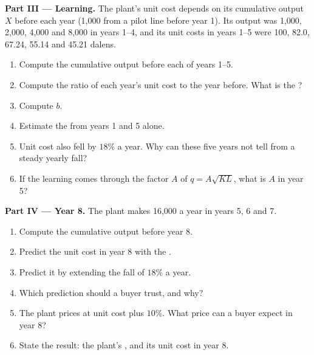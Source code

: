 \begin{problem}
\medskip\noindent\textbf{Part III --- Learning.} The plant's unit cost depends on
its cumulative output $X$ before each year (1,000 from a pilot line before
year 1). Its output was 1,000, 2,000, 4,000 and 8,000 in years 1--4, and its
unit costs in years 1--5 were 100, 82.0, 67.24, 55.14 and 45.21 dalens.
\begin{enumerate}[resume]
  \item Compute the cumulative output before each of years 1--5.
  \item Compute the ratio of each year's unit cost to the year before. What is the ?
  \item Compute $b$.
  \item Estimate the  from years 1 and 5 alone.
  \item Unit cost also fell by $18\%$ a year. Why can these five years not tell  from a steady yearly fall?
  \item If the learning comes through the factor $A$ of $q = A\sqrt{KL}$, what is $A$ in year 5?
\end{enumerate}

\medskip\noindent\textbf{Part IV --- Year 8.} The plant makes 16,000 a year in years
5, 6 and 7.
\begin{enumerate}[resume]
  \item Compute the cumulative output before year 8.
  \item Predict the unit cost in year 8 with the .
  \item Predict it by extending the fall of $18\%$ a year.
  \item Which prediction should a buyer trust, and why?
  \item The plant prices at unit cost plus $10\%$. What price can a buyer expect in year 8?
  \item State the result: the plant's , and its unit cost in year 8.
\end{enumerate}
\end{problem}
